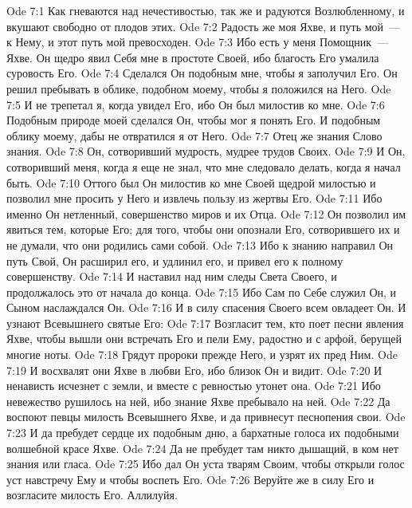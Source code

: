 \vs Ode 7:1
Как гневаются
над нечестивостью, так же и радуются Возлюбленному, и вкушают свободно от плодов
этих.
\vs Ode 7:2
Радость же моя
Яхве, и путь мой~--- к Нему, и этот путь мой превосходен.
\vs Ode 7:3
Ибо есть у
меня Помощник~--- Яхве. Он щедро явил Себя мне в простоте Своей, ибо благость Его
умалила суровость Его.
\vs Ode 7:4
Сделался Он
подобным мне, чтобы я заполучил Его. Он решил пребывать в облике, подобном
моему, чтобы я положился на Него.
\vs Ode 7:5
И не трепетал
я, когда увидел Его, ибо Он был милостив ко мне.
\vs Ode 7:6
Подобным
природе моей сделался Он, чтобы мог я понять Его. И подобным облику моему, дабы
не отвратился я от Него.
\vs Ode 7:7
Отец же знания
Слово знания.
\vs Ode 7:8
Он,
сотворивший мудрость, мудрее трудов Своих.
\vs Ode 7:9
И Он,
сотворивший меня, когда я еще не знал, что мне следовало делать, когда я начал
быть.
\vs Ode 7:10
Оттого был Он
милостив ко мне Своей щедрой милостью и позволил мне просить у Него и извлечь
пользу из жертвы Его.
\vs Ode 7:11
Ибо именно Он
нетленный, совершенство миров и их Отца.
\vs Ode 7:12
Он позволил
им явиться тем, которые Его; для того, чтобы они опознали Его, сотворившего их и
не думали, что они родились сами собой.
\vs Ode 7:13
Ибо к знанию
направил Он путь Свой, Он расширил его, и удлинил его, и привел его к полному
совершенству.
\vs Ode 7:14
И наставил
над ним следы Света Своего, и продолжалось это от начала до конца.
\vs Ode 7:15
Ибо Сам по
Себе служил Он, и Сыном наслаждался Он.
\vs Ode 7:16
И в силу
спасения Своего всем овладеет Он. И узнают Всевышнего святые Его:
\vs Ode 7:17
Возгласит
тем, кто поет песни явления Яхве, чтобы вышли они встречать Его и пели Ему,
радостно и с арфой, берущей многие ноты.
\vs Ode 7:18
Грядут
пророки прежде Него, и узрят их пред Ним.
\vs Ode 7:19
И восхвалят
они Яхве в любви Его, ибо близок Он и видит.
\vs Ode 7:20
И ненависть
исчезнет с земли, и вместе с ревностью утонет она.
\vs Ode 7:21
Ибо
невежество рушилось на ней, ибо знание Яхве пребывало на ней.
\vs Ode 7:22
Да воспоют
певцы милость Всевышнего Яхве, и да привнесут песнопения свои.
\vs Ode 7:23
И да пребудет
сердце их подобным дню, а бархатные голоса их подобными волшебной красе Яхве.
\vs Ode 7:24
Да не
пребудет там никто дышащий, в ком нет знания или гласа.
\vs Ode 7:25
Ибо дал Он
уста тварям Своим, чтобы открыли голос уст навстречу Ему и чтобы воспеть Его.
\vs Ode 7:26
Веруйте же в
силу Его и возгласите милость Его.
Аллилуйя.

